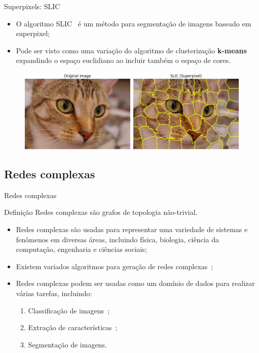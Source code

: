 \documentclass{templatebeamerufc/libs/ufc_format}
\begin{document}
\begin{frame}{Superpixels: SLIC}

  \begin{itemize}
  \item  O algoritmo SLIC~\cite{achanta2010slic} é um
    método para segmentação de imagens baseado em superpixel;
  \item Pode ser visto como uma variação do algoritmo de clusterização \textbf{k-means} expandindo
    o espaço euclidiano ao incluir também o espaço de cores.
  \end{itemize}
  \begin{figure}\label{fig:slic}
     \centering
        \includegraphics[scale=0.40]{figuras/slic2}
   \end{figure}
\end{frame}

\subsection{Redes complexas}

\begin{frame}{Redes complexas}
  \begin{block}{Definição}
    Redes complexas são grafos de topologia não-trivial.
  \end{block}
  \begin{itemize}
  \item Redes complexas são usadas para representar uma variedade de
sistemas e fenômenos em diversas áreas, incluindo física, biologia,
ciência da computação, engenharia e ciências sociais;
    \item Existem variados algoritmos para geração de redes complexas~\cite{ComplexNetworksSurvey2007};
    \item Redes complexas podem ser usadas como um domínio de dados para realizar várias tarefas, incluindo:
    \begin{enumerate}
        \item Classificação de imagens~\cite{ComplexNetworksImageClassification2015};
        \item Extração de características~\cite{JarbasComplexNetworks2020};
        \item Segmentação de imagens.
    \end{enumerate}
  \end{itemize}
\end{frame}
\end{document}
